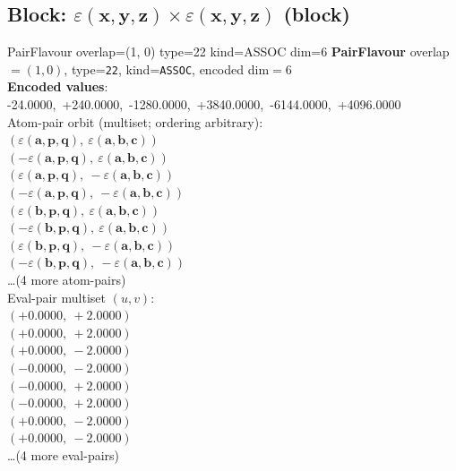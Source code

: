 \documentclass[a4paper,11pt]{article}
\newcommand{\kblbmcpggoncpf}[3]{\varepsilon(\mathbf{#1},\mathbf{#2},\mathbf{#3})}
\begin{document}
\subsection{Block: $\kblbmcpggoncpf{x}{y}{z} \times \kblbmcpggoncpf{x}{y}{z}$  (block)}
    PairFlavour  overlap=(1, 0)  type=22  kind=ASSOC  dim=6
\textbf{PairFlavour} overlap$=(1, 0)$, type=\texttt{22}, kind=\texttt{ASSOC}, encoded dim$=6$\\
\textbf{      Encoded values}: -24.0000,\ +240.0000,\ -1280.0000,\ +3840.0000,\ -6144.0000,\ +4096.0000\\
\quad Atom-pair orbit (multiset; ordering arbitrary):\\
$(\kblbmcpggoncpf{a}{p}{q},\ \kblbmcpggoncpf{a}{b}{c})$\\
$(-\kblbmcpggoncpf{a}{p}{q},\ \kblbmcpggoncpf{a}{b}{c})$\\
$(\kblbmcpggoncpf{a}{p}{q},\ -\kblbmcpggoncpf{a}{b}{c})$\\
$(-\kblbmcpggoncpf{a}{p}{q},\ -\kblbmcpggoncpf{a}{b}{c})$\\
$(\kblbmcpggoncpf{b}{p}{q},\ \kblbmcpggoncpf{a}{b}{c})$\\
$(-\kblbmcpggoncpf{b}{p}{q},\ \kblbmcpggoncpf{a}{b}{c})$\\
$(\kblbmcpggoncpf{b}{p}{q},\ -\kblbmcpggoncpf{a}{b}{c})$\\
$(-\kblbmcpggoncpf{b}{p}{q},\ -\kblbmcpggoncpf{a}{b}{c})$\\
\quad \ldots (4 more atom-pairs)\\
\quad Eval-pair multiset $(u, v)$:\\
$(+0.0000,\ +2.0000)$\\
$(+0.0000,\ +2.0000)$\\
$(+0.0000,\ -2.0000)$\\
$(-0.0000,\ -2.0000)$\\
$(-0.0000,\ +2.0000)$\\
$(-0.0000,\ +2.0000)$\\
$(+0.0000,\ -2.0000)$\\
$(+0.0000,\ -2.0000)$\\
\quad \ldots (4 more eval-pairs)\\
\end{document}
